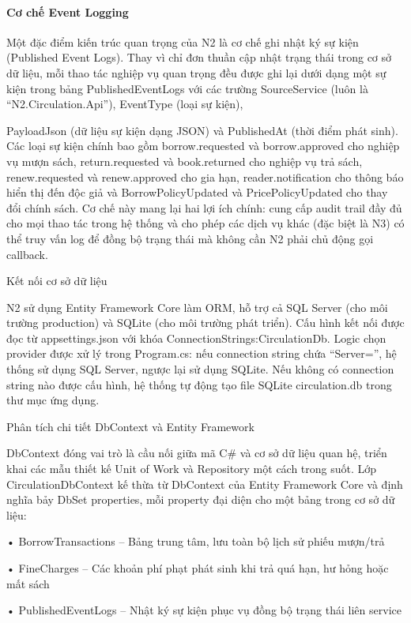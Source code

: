 \paragraph{Cơ chế Event Logging}

Một đặc điểm kiến trúc quan trọng của N2 là cơ chế ghi nhật ký sự kiện (Published Event Logs). Thay vì chỉ đơn thuần cập nhật trạng thái trong cơ sở dữ liệu, mỗi thao tác nghiệp vụ quan trọng đều được ghi lại dưới dạng một sự kiện trong bảng PublishedEventLogs với các trường SourceService (luôn là “N2.Circulation.Api”), EventType (loại sự kiện),

PayloadJson (dữ liệu sự kiện dạng JSON) và PublishedAt (thời điểm phát sinh). Các loại sự kiện chính bao gồm borrow.requested và borrow.approved cho nghiệp vụ mượn sách, return.requested và book.returned cho nghiệp vụ trả sách, renew.requested và renew.approved cho gia hạn, reader.notification cho thông báo hiển thị đến độc giả và BorrowPolicyUpdated và PricePolicyUpdated cho thay đổi chính sách. Cơ chế này mang lại hai lợi ích chính: cung cấp audit trail đầy đủ cho mọi thao tác trong hệ thống và cho phép các dịch vụ khác (đặc biệt là N3) có thể truy vấn log để đồng bộ trạng thái mà không cần N2 phải chủ động gọi callback.

Kết nối cơ sở dữ liệu

N2 sử dụng Entity Framework Core làm ORM, hỗ trợ cả SQL Server (cho môi trường production) và SQLite (cho môi trường phát triển). Cấu hình kết nối được đọc từ appsettings.json với khóa ConnectionStrings:CirculationDb. Logic chọn provider được xử lý trong Program.cs: nếu connection string chứa “Server=”, hệ thống sử dụng SQL Server, ngược lại sử dụng SQLite. Nếu không có connection string nào được cấu hình, hệ thống tự động tạo file SQLite circulation.db trong thư mục ứng dụng.

Phân tích chi tiết DbContext và Entity Framework

DbContext đóng vai trò là cầu nối giữa mã C\# và cơ sở dữ liệu quan hệ, triển khai các mẫu thiết kế Unit of Work và Repository một cách trong suốt. Lớp CirculationDbContext kế thừa từ DbContext của Entity Framework Core và định nghĩa bảy DbSet properties, mỗi property đại diện cho một bảng trong cơ sở dữ liệu:

• BorrowTransactions – Bảng trung tâm, lưu toàn bộ lịch sử phiếu mượn/trả

• FineCharges – Các khoản phí phạt phát sinh khi trả quá hạn, hư hỏng hoặc mất sách

• PublishedEventLogs – Nhật ký sự kiện phục vụ đồng bộ trạng thái liên service

